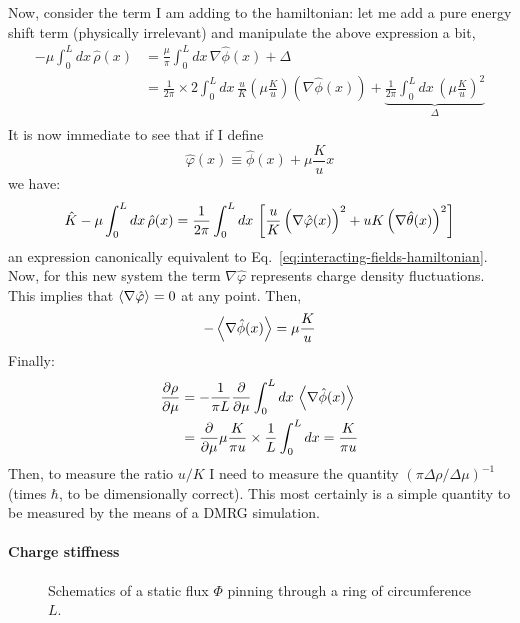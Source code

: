 Now, consider the term I am adding to the hamiltonian: let me add a pure energy shift term (physically irrelevant) and manipulate the above expression a bit,
\[
\begin{aligned}
	- \mu \int_0^L dx \, \hat \rho(x) &= \frac{\mu}{\pi} \int_0^L dx \, \nabla \hat \phi(x) + \Delta \\
	&= \frac{1}{2\pi} \times 2 \int_0^L dx \, \frac{u}{K} \left( \mu \frac{K}{u} \right) \left( \nabla \hat \phi(x) \right) + \underbrace{
		\frac{1}{2\pi} \int_0^L dx \, \left( \mu \frac{K}{u} \right)^2
	}_{\Delta} \\
\end{aligned}	
\]
It is now immediate to see that if I define
\[
	\hat \varphi(x) \equiv \hat \phi(x) + \mu \frac{K}{u} x
\]
we have:
\[
	\hat K - \mu \int_0^L dx \, \hat \rho(x) =  \frac{1}{2\pi} \int_0^L dx \, \left[ \frac{u}{K} \left( \vphantom{\hat\theta} \nabla \hat \varphi(x) \right)^2 + uK \left( \nabla \hat \theta(x) \right)^2 \right]
\]
an expression canonically equivalent to Eq.~\eqref{eq:interacting-fields-hamiltonian}. Now, for this new system the term $\nabla \hat \varphi$ represents charge density fluctuations. This implies that $\ev{\nabla \hat \varphi} = 0$ at any point. Then,
\[
	- \ev{\nabla \hat \phi(x)} = \mu \frac{K}{u}
\]
Finally:
\begin{equation}
	\begin{aligned}
		\pdv{\rho}{\mu}	&= - \frac{1}{\pi L} \pdv{}{\mu} \int_0^L dx \, \ev{\nabla \hat \phi(x)} \\
		&= \pdv{}{\mu} \mu \frac{K}{\pi u} \times \frac{1}{L} \int_0^L dx = \frac{K}{\pi u} \label{eq:charge-compressibility}
	\end{aligned}
\end{equation}
Then, to measure the ratio $u/K$ I need to measure the quantity $(\pi \Delta \rho / \Delta \mu)^{-1}$ (times $\hbar$, to be dimensionally correct). This most certainly is a simple quantity to be measured by the means of a DMRG simulation.

\paragraph{Charge stiffness}

\begin{figure}
	\centering
	
	\caption{Schematics of a static flux $\Phi$ pinning through a ring of circumference $L$.}
	\label{fig:flux-through-ring}
\end{figure}

